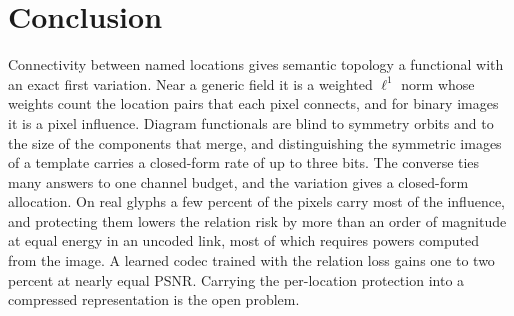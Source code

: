\documentclass[10pt,conference]{IEEEtran}
\begin{document}
\section{Conclusion}
Connectivity between named locations gives semantic topology a functional with an exact first variation. Near a generic field it is a weighted $\ell^1$ norm whose weights count the location pairs that each pixel connects, and for binary images it is a pixel influence. Diagram functionals are blind to symmetry orbits and to the size of the components that merge, and distinguishing the symmetric images of a template carries a closed-form rate of up to three bits. The converse ties many answers to one channel budget, and the variation gives a closed-form allocation. On real glyphs a few percent of the pixels carry most of the influence, and protecting them lowers the relation risk by more than an order of magnitude at equal energy in an uncoded link, most of which requires powers computed from the image. A learned codec trained with the relation loss gains one to two percent at nearly equal PSNR. Carrying the per-location protection into a compressed representation is the open problem.


\end{document}
